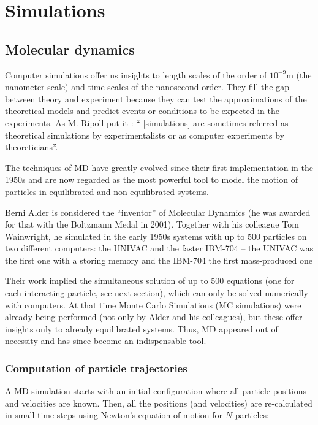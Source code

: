 \section{Simulations}

\subsection{Molecular dynamics}

Computer simulations offer us insights to length scales of the order
of $10^{-9}\mathrm{m}$ (the nanometer scale) and time scales of the
nanosecond order. They fill the gap between theory and experiment
because they can test the approximations of the theoretical models
and predict events or conditions to be expected in the experiments.
As M. Ripoll put it \cite{ripoll:2011}: `` {[}simulations{]} are
sometimes referred as theoretical simulations by experimentalists
or as computer experiments by theoreticians''.

The techniques of MD have greatly evolved since their first implementation
in the 1950s and are now regarded as the most powerful tool to model
the motion of particles in equilibrated and non-equilibrated systems.

Berni Alder is considered the ``inventor'' of Molecular Dynamics
(he was awarded for that with the Boltzmann Medal in 2001). Together
with his colleague Tom Wainwright, he simulated in the early 1950s
systems with up to 500 particles on two different computers: the UNIVAC
and the faster IBM-704 -- the UNIVAC was the first one with a storing
memory and the IBM-704 the first mass-produced one \cite{alder:1957,alder:2009}

Their work implied the simultaneous solution of up to 500 equations
(one for each interacting particle, see next section), which can only
be solved numerically with computers. At that time Monte Carlo Simulations
(MC simulations) were already being performed (not only by Alder and
his colleagues), but these offer insights only to already equilibrated
systems. Thus, MD appeared out of necessity and has since become an
indispensable tool.

\subsubsection{Computation of particle trajectories }

A MD simulation starts with an initial configuration where all particle
positions and velocities are known. Then, all the positions (and velocities)
are re-calculated in small time steps using Newton's equation of motion
for $N$ particles:

